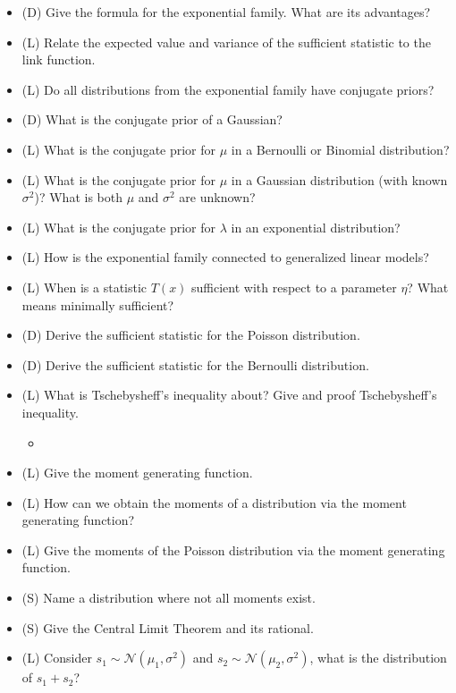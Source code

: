 \begin{itemize}
    \item (D) Give the formula for the exponential family. What are its advantages?
    \answerboxM
    \item (L) Relate the expected value and variance of the sufficient statistic to the link function.
    \answerboxM
    \item (L) Do all distributions from the exponential family have conjugate priors?
    \answerboxS
    \item (D) What is the conjugate prior of a Gaussian?
    \answerboxM
    \item (L) What is the conjugate prior for $\mu$ in a Bernoulli or Binomial distribution?
    \answerboxM
    \item (L) What is the conjugate prior for $\mu$ in a Gaussian distribution (with known $\sigma^2$)? What
    is both $\mu$ and $\sigma^2$ are unknown?
    \answerboxM
    \item (L) What is the conjugate prior for $\lambda$ in an exponential distribution?
    \answerboxM
    \item (L) How is the exponential family connected to generalized linear models?
    \answerboxL
    \item (L) When is a statistic $T(x)$ sufficient with respect to a parameter $\eta$? What means minimally sufficient?
    \answerboxM
    \item (D) Derive the sufficient statistic for the Poisson distribution.
    \answerboxL
    \item (D) Derive the sufficient statistic for the Bernoulli distribution.
    \answerboxL
    \item (L) What is Tschebysheff's inequality about? Give and proof Tschebysheff's inequality.
    \begin{itemize}
        \item {}
    \end{itemize}
    \answerboxL
    \item (L) Give the moment generating function.
    \answerboxM
    \item (L) How can we obtain the moments of a distribution via the moment generating function?
    \answerboxM
    \item (L) Give the moments of the Poisson distribution via the moment generating function.
    \answerboxM
    \item (S) Name a distribution where not all moments exist.
    \answerboxM
    \item (S) Give the Central Limit Theorem and its rational.
    \answerboxM
    \item (L) Consider $s_1 \sim \mathcal{N}(\mu_1,\sigma^2)$ and $s_2 \sim \mathcal{N}(\mu_2,\sigma^2)$, what is the distribution of $s_1 + s_2$?
    \answerboxM
\end{itemize}

